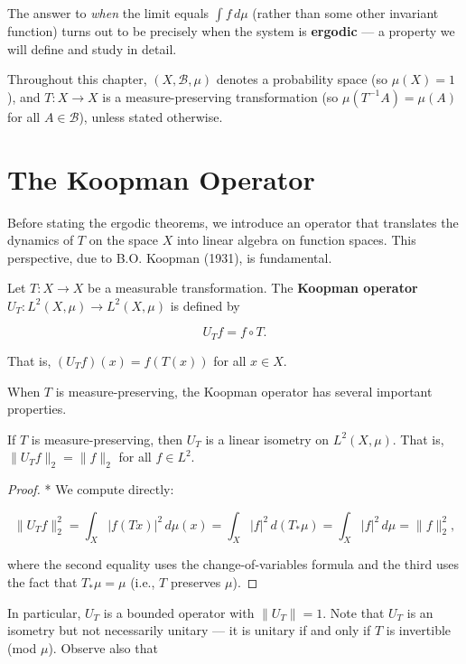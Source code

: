 The answer to \textit{when} the limit equals $\int f \, d\mu$ (rather than some other invariant function) turns out to be precisely when the system is \textbf{ergodic} --- a property we will define and study in detail.

Throughout this chapter, $(X, \mathcal{B}, \mu)$ denotes a probability space (so $\mu(X) = 1$), and $T: X \to X$ is a measure-preserving transformation (so $\mu(T^{-1}A) = \mu(A)$ for all $A \in \mathcal{B}$), unless stated otherwise.


\section{The Koopman Operator}\label{sec:9.2}

Before stating the ergodic theorems, we introduce an operator that translates the dynamics of $T$ on the space $X$ into linear algebra on function spaces. This perspective, due to B.O. Koopman (1931), is fundamental.

\begin{definition}\label{def:9.1}
Let $T: X \to X$ be a measurable transformation. The \textbf{Koopman operator} $U_T: L^2(X, \mu) \to L^2(X, \mu)$ is defined by

\[
U_T f = f \circ T.
\]

That is, $(U_T f)(x) = f(T(x))$ for all $x \in X$.

When $T$ is measure-preserving, the Koopman operator has several important properties.
\end{definition}


\begin{proposition}\label{prop:9.2.}
If $T$ is measure-preserving, then $U_T$ is a linear isometry on $L^2(X, \mu)$. That is, $\|U_T f\|_2 = \|f\|_2$ for all $f \in L^2$.
\end{proposition}


\begin{proof}
* We compute directly:

\[
\|U_T f\|_2^2 = \int_X |f(Tx)|^2 \, d\mu(x) = \int_X |f|^2 \, d(T_* \mu) = \int_X |f|^2 \, d\mu = \|f\|_2^2,
\]

where the second equality uses the change-of-variables formula and the third uses the fact that $T_* \mu = \mu$ (i.e., $T$ preserves $\mu$).
\end{proof}


In particular, $U_T$ is a bounded operator with $\|U_T\| = 1$. Note that $U_T$ is an isometry but not necessarily unitary --- it is unitary if and only if $T$ is invertible (mod $\mu$). Observe also that

